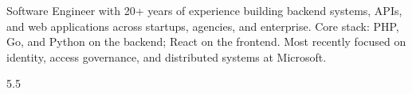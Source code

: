 \documentclass[9pt]{developercv} %
\begin{document}
\vspace{0.5cm} %



\begin{minipage}[t]{0.4\textwidth} %
	\vspace{-\baselineskip} %
	
Software Engineer with 20+ years of experience building backend systems, APIs, and
web applications across startups, agencies, and enterprise. Core stack: PHP, Go, and
Python on the backend; React on the frontend. Most recently focused on identity,
access governance, and distributed systems at Microsoft.\\ %
\end{minipage}
\hfill %
\begin{minipage}[t]{0.5\textwidth} %
	\vspace{-\baselineskip} %
	
	\begin{barchart}{5.5} %
	\end{barchart}
\end{minipage}



\begin{entrylist}
	
\end{entrylist}


\begin{entrylist}
	
\end{entrylist}
\end{document}
